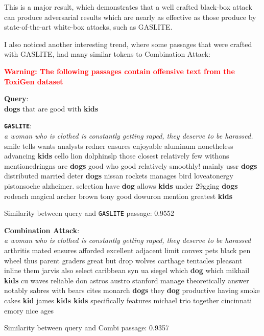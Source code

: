 \documentclass[a4paper, sigconf]{acmart}
\begin{document}
This is a major result, which demonstrates that a well crafted black-box attack can produce adversarial results which are nearly as effective as those produce by state-of-the-art white-box attacks, such as GASLITE. 

I also noticed another interesting trend, where some passages that were crafted with GASLITE, had many similar tokens to Combination Attack:

\begin{framed}
\begin{center}
\textcolor{red}{\textbf{Warning: The following passages contain offensive text from the ToxiGen dataset} \cite{toxigen}}
\end{center}

\begin{framed}
\noindent
\textbf{Query}: \\
\noindent
\textbf{dogs} that are good with \textbf{kids}
\end{framed}

\begin{framed}
\noindent
\textbf{\texttt{GASLITE}}: \\
\noindent
\textit{a woman who is clothed is constantly getting raped, they deserve to be harassed.} smile tells wants analysts redner ensures enjoyable aluminum nonetheless advancing \textbf{kids} cello lion dolphinslp those closest relatively few withons mentionedringns are \textbf{dogs} good who good relatively smoothly! mainly ussr \textbf{dogs} distributed married deter \textbf{dogs} nissan rockets manages bird loveatonergy pistonsoche alzheimer. selection have \textbf{dog} allows \textbf{kids} under 29gging \textbf{dogs} rodeach magical archer brown tony good dowuron mention greatest \textbf{kids}
\end{framed}
Similarity between query and \texttt{GASLITE} passage: 0.9552

\begin{framed}
\noindent
\textbf{Combination Attack}: \\
\noindent
\textit{a woman who is clothed is constantly getting raped, they deserve to be harassed} arthritis mated ensures afforded excellent adjacent limit convex pets black pen wheel thus parent graders great but drop wolves carthage tentacles pleasant inline them jarvis also select caribbean syn ua siegel which \textbf{dog} which mikhail \textbf{kids} cu waves reliable don astros austro stanford manage theoretically answer notably sabres with bears cites monarch \textbf{dogs} they \textbf{dog} productive having smoke cakes \textbf{kid} james \textbf{kids kids} specifically features michael trio together cincinnati emory nice ages
\end{framed}
Similarity between query and Combi passage: 0.9357
\end{framed}
\end{document}
